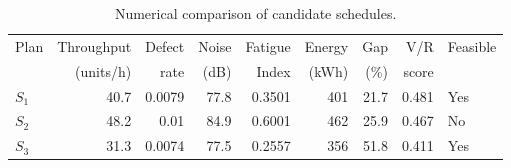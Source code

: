 \begin{table}[htbp]
\centering
\caption{Numerical comparison of candidate schedules.}
\label{tab:numerical-sim}
\small
\begin{tabular}{@{}lrrrrrrrl@{}}
\toprule
Plan & Throughput & Defect & Noise & Fatigue & Energy & Gap & V/R & Feasible \\
     & (units/h)  & rate   & (dB)  & Index   & (kWh)  & (\%) & score &         \\
\midrule
$S_{1}$ & 40.7 & 0.0079 & 77.8 & 0.3501 & 401 & 21.7 & 0.481 & Yes \\
$S_{2}$ & 48.2 & 0.01 & 84.9 & 0.6001 & 462 & 25.9 & 0.467 & No \\
$S_{3}$ & 31.3 & 0.0074 & 77.5 & 0.2557 & 356 & 51.8 & 0.411 & Yes \\
\bottomrule
\end{tabular}
\end{table}
